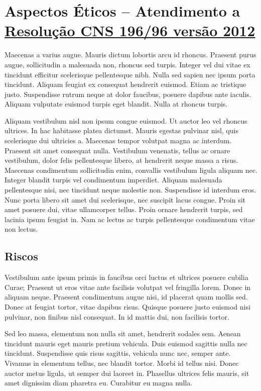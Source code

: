 \documentclass[
	12pt,				%
	a4paper,			%
    openany,
    oneside,
	english,			%
	french,				%
	spanish,			%
	brazil,				%
	]{abntex2}
\begin{document}
\section{Aspectos Éticos – Atendimento a \href{http://conselho.saude.gov.br/web_comissoes/conep/aquivos/resolucoes/23_out_versao_final_196_ENCEP2012.pdf}{Resolução CNS 196/96 versão 2012}}

Maecenas a varius augue. Mauris dictum lobortis arcu id rhoncus. Praesent purus augue, sollicitudin a malesuada non, rhoncus sed turpis. Integer vel dui vitae ex tincidunt efficitur scelerisque pellentesque nibh. Nulla sed sapien nec ipsum porta tincidunt. Aliquam feugiat ex consequat hendrerit euismod. Etiam ac tristique justo. Suspendisse rutrum neque at dolor faucibus, posuere dapibus ante iaculis. Aliquam vulputate euismod turpis eget blandit. Nulla at rhoncus turpis.

Aliquam vestibulum nisl non ipsum congue euismod. Ut auctor leo vel rhoncus ultrices. In hac habitasse platea dictumst. Mauris egestas pulvinar nisl, quis scelerisque dui ultricies a. Maecenas tempor volutpat magna ac interdum. Praesent sit amet consequat nulla. Vestibulum venenatis, tellus ac ornare vestibulum, dolor felis pellentesque libero, at hendrerit neque massa a risus. Maecenas condimentum sollicitudin enim, convallis vestibulum ligula aliquam nec. Integer blandit turpis vel condimentum imperdiet. Aliquam malesuada pellentesque nisi, nec tincidunt neque molestie non. Suspendisse id interdum eros. Nunc porta libero sit amet dui scelerisque, nec suscipit lacus congue. Proin sit amet posuere dui, vitae ullamcorper tellus. Proin ornare hendrerit turpis, sed lacinia ipsum feugiat in. Nam ac lectus ac turpis pellentesque condimentum vitae non lectus.

\subsection{Riscos}

Vestibulum ante ipsum primis in faucibus orci luctus et ultrices posuere cubilia Curae; Praesent ut eros vitae ante facilisis volutpat vel fringilla lorem. Donec in aliquam neque. Praesent condimentum augue nisi, id placerat quam mollis sed. Donec at feugiat tortor, vitae dapibus risus. Quisque posuere justo euismod nisi pulvinar, non finibus nisl consequat. In id mattis dui, non facilisis tortor.

Sed leo massa, elementum non nulla sit amet, hendrerit sodales sem. Aenean tincidunt mauris eget mauris pretium vehicula. Duis euismod sagittis nulla nec tincidunt. Suspendisse quis risus sagittis, vehicula nunc nec, semper ante. Vivamus in elementum tellus, nec blandit tortor. Morbi id tellus nisi. Donec auctor metus ligula, ut semper dui laoreet in. Phasellus ultrices felis mauris, sit amet dignissim diam pharetra eu. Curabitur eu magna nulla.
\end{document}
